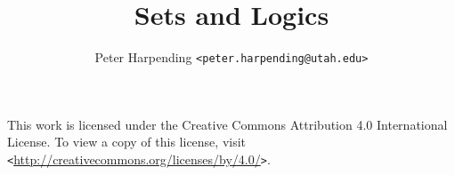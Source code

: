 \documentclass[12pt,oneside,ebook]{memoir}
\newcommand{\monospace}{\texttt}
\newcommand{\barelink}[1]{\monospace{<}\url{#1}\monospace{>}}
\newcommand{\anauthor}[2]{#1 \monospace{<{#2}>}}
\begin{document}
\title{Sets and Logics}
\author{\anauthor{Peter Harpending}{peter.harpending@utah.edu}}
\maketitle

\newpage
{
  \noindent\footnotesize
  This work is licensed under the Creative Commons Attribution 4.0
  International License. To view a copy of this license, visit
  \barelink{http://creativecommons.org/licenses/by/4.0/}.
}
\tableofcontents



\printbibliography
\end{document}

